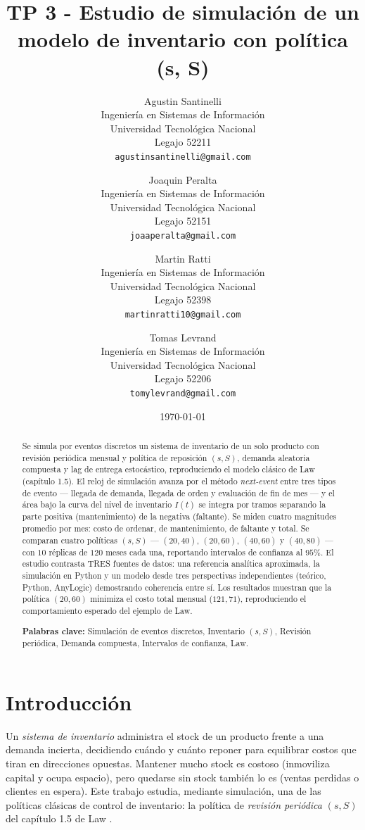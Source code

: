 \documentclass[11pt]{article}
\title{\textbf{TP 3 - Estudio de simulaci\'on de un modelo de inventario
con pol\'itica (s, S)}}
\author{
  Agustin Santinelli \\
  Ingenier\'ia en Sistemas de Informaci\'on \\
  Universidad Tecnol\'ogica Nacional \\
  Legajo 52211 \\
  \texttt{agustinsantinelli@gmail.com}
  \and
  Joaquin Peralta \\
  Ingenier\'ia en Sistemas de Informaci\'on \\
  Universidad Tecnol\'ogica Nacional \\
  Legajo 52151 \\
  \texttt{joaaperalta@gmail.com}
  \and
  Martin Ratti \\
  Ingenier\'ia en Sistemas de Informaci\'on \\
  Universidad Tecnol\'ogica Nacional \\
  Legajo 52398 \\
  \texttt{martinratti10@gmail.com}
  \and
  Tomas Levrand \\
  Ingenier\'ia en Sistemas de Informaci\'on \\
  Universidad Tecnol\'ogica Nacional \\
  Legajo 52206 \\
  \texttt{tomylevrand@gmail.com}
}
\date{\today}
\begin{document}
\maketitle

\begin{abstract}
\noindent Se simula por eventos discretos un sistema de inventario de un solo
producto con revisi\'on peri\'odica mensual y pol\'itica de reposici\'on
$(s, S)$, demanda aleatoria compuesta y lag de entrega estoc\'astico,
reproduciendo el modelo cl\'asico de Law \cite{law} (cap\'itulo 1.5). El reloj
de simulaci\'on avanza por el m\'etodo \emph{next-event} entre tres tipos de
evento --- llegada de demanda, llegada de orden y evaluaci\'on de fin de mes
--- y el \'area bajo la curva del nivel de inventario $I(t)$ se integra por
tramos separando la parte positiva (mantenimiento) de la negativa (faltante).
Se miden cuatro magnitudes promedio por mes: costo de ordenar, de
mantenimiento, de faltante y total. Se comparan cuatro pol\'iticas
$(s, S)$ --- $(20,40)$, $(20,60)$, $(40,60)$ y $(40,80)$ --- con $10$ r\'eplicas
de $120$ meses cada una, reportando intervalos de confianza al $95\%$. El
estudio contrasta TRES fuentes de datos: una referencia anal\'itica
aproximada, la simulaci\'on en Python y un modelo desde tres perspectivas
independientes (te\'orico, Python, AnyLogic) demostrando coherencia entre
s\'i. Los resultados muestran que la pol\'itica $(20, 60)$ minimiza el costo
total mensual ($121{,}71$), reproduciendo el comportamiento esperado del
ejemplo de Law.

\vspace{0.5em}
\noindent\textbf{Palabras clave:} Simulaci\'on de eventos discretos,
Inventario $(s, S)$, Revisi\'on peri\'odica, Demanda compuesta, Intervalos de
confianza, Law.
\end{abstract}

\section{Introducci\'on}

Un \emph{sistema de inventario} administra el stock de un producto frente a
una demanda incierta, decidiendo cu\'ando y cu\'anto reponer para equilibrar
costos que tiran en direcciones opuestas. Mantener mucho stock es costoso
(inmoviliza capital y ocupa espacio), pero quedarse sin stock tambi\'en lo es
(ventas perdidas o clientes en espera). Este trabajo estudia, mediante
simulaci\'on, una de las pol\'iticas cl\'asicas de control de inventario: la
pol\'itica de \emph{revisi\'on peri\'odica} $(s, S)$ del cap\'itulo 1.5 de
Law \cite{law}.
\end{document}
